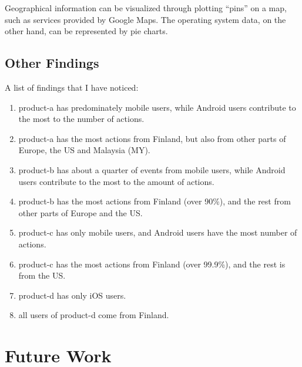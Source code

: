 \documentclass[12pt,letter]{article}
\newcommand{\be}{\begin{enumerate}}
\newcommand{\ee}{\end{enumerate}}
\begin{document}
  Geographical information can be visualized through plotting ``pins'' on a map,
  such as services provided by Google Maps. The operating system data, on the
  other hand, can be represented by pie charts.

  \subsection{Other Findings}
  A list of findings that I have noticed:
  \be
  \item product-a has predominately mobile users, while Android users contribute
      to the most to the number of actions.
  \item product-a has the most actions from Finland, but also from other parts
      of Europe, the US and Malaysia (MY).
  \item product-b has about a quarter of events from mobile users, while Android
      users contribute to the most to the amount of actions.
  \item product-b has the most actions from Finland (over 90\%), and the rest
      from other parts of Europe and the US.
  \item product-c has only mobile users, and Android
      users have the most number of actions.
  \item product-c has the most actions from Finland (over 99.9\%), and the rest
      is from the US.
  \item product-d has only iOS users.
  \item all users of product-d come from Finland.
  \ee

  \section{Future Work}
\end{document}

